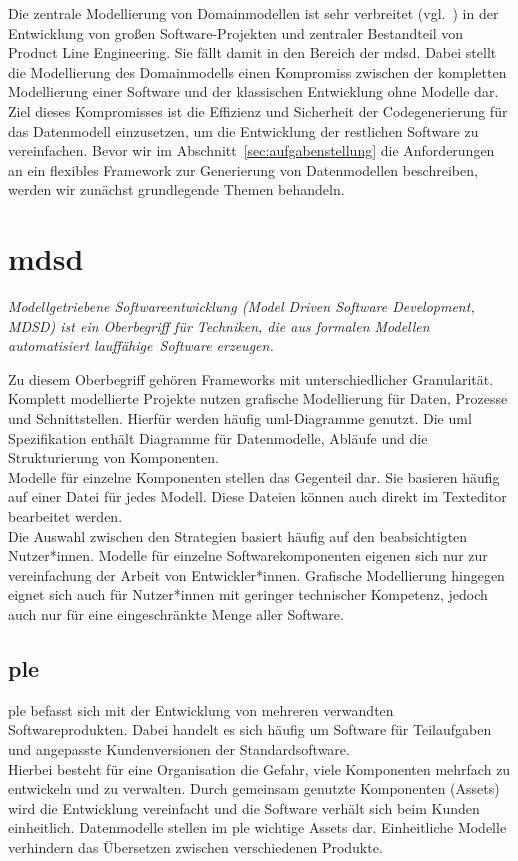 \documentclass[./einleitung.tex]{subfiles}
\begin{document}
Die zentrale Modellierung von Domainmodellen ist sehr verbreitet (vgl.~\cite[p. 7]{usageOfMDSD}) in der Entwicklung von großen Software-Projekten und zentraler Bestandteil von Product Line Engineering.
Sie fällt damit in den Bereich der \acrfull{mdsd}.
Dabei stellt die Modellierung des Domainmodells einen Kompromiss zwischen der kompletten Modellierung einer Software und der klassischen Entwicklung ohne Modelle dar. \\
Ziel dieses Kompromisses ist die Effizienz und Sicherheit der Codegenerierung für das Datenmodell einzusetzen, um die Entwicklung der restlichen Software zu vereinfachen.
Bevor wir im Abschnitt~\ref{sec:aufgabenstellung} die Anforderungen an ein flexibles Framework zur Generierung von Datenmodellen beschreiben, werden wir zunächst grundlegende Themen behandeln.
\section{\acrfull{mdsd}}\label{subsec:mdsd}
\begin{center}
    \textit{Modellgetriebene Softwareentwicklung (Model Driven Software Development, MDSD) ist ein Oberbegriff für Techniken, die aus formalen Modellen automatisiert lauffähige~Software erzeugen.} \cite[p. 11]{modellbuch}
\end{center}
Zu diesem Oberbegriff gehören Frameworks mit unterschiedlicher Granularität.
Komplett modellierte Projekte nutzen grafische Modellierung für Daten, Prozesse und Schnittstellen.
Hierfür werden häufig \acrshort{uml}-Diagramme genutzt.
Die \acrshort{uml} Spezifikation enthält Diagramme für Datenmodelle, Abläufe und die Strukturierung von Komponenten.\\
Modelle für einzelne Komponenten stellen das Gegenteil dar.
Sie basieren häufig auf einer Datei für jedes Modell.
Diese Dateien können auch direkt im Texteditor bearbeitet werden.\\
Die Auswahl zwischen den Strategien basiert häufig auf den beabsichtigten Nutzer*innen.
Modelle für einzelne Softwarekomponenten eigenen sich nur zur vereinfachung der Arbeit von Entwickler*innen.
Grafische Modellierung hingegen eignet sich auch für Nutzer*innen mit geringer technischer Kompetenz, jedoch auch nur für eine eingeschränkte Menge aller Software.

\subsection{\acrfull{ple}}\label{subsec:ple}
\acrshort{ple} befasst sich mit der Entwicklung von mehreren verwandten Softwareprodukten.
Dabei handelt es sich häufig um Software für Teilaufgaben und angepasste Kundenversionen der Standardsoftware. \\
Hierbei besteht für eine Organisation die Gefahr, viele Komponenten mehrfach zu entwickeln und zu verwalten.
Durch gemeinsam genutzte Komponenten (Assets) wird die Entwicklung vereinfacht und die Software verhält sich beim Kunden einheitlich.
Datenmodelle stellen im \acrshort{ple} wichtige Assets dar.
Einheitliche Modelle verhindern das Übersetzen zwischen verschiedenen Produkte.
\end{document}
